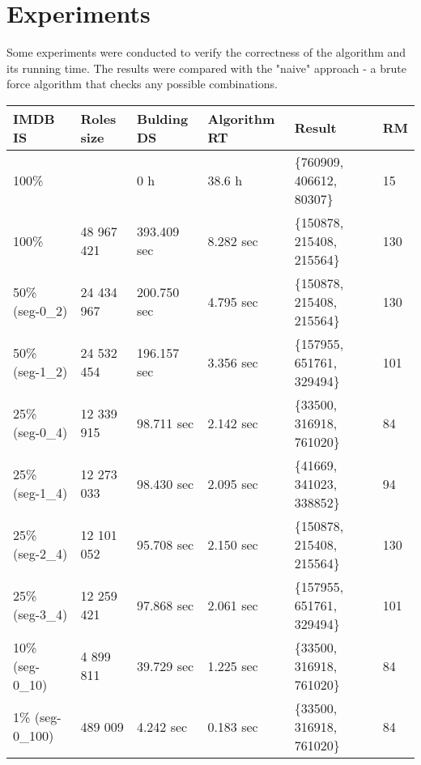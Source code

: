 \label{Experiments}
\section{Experiments}


Some experiments were conducted to verify the correctness of the algorithm and its running time. The results were compared with the "naive" approach - a brute force algorithm that checks any possible combinations. 

\begin{table}[h]
\begin{tabular}{|l|l|l|l|l|l|}
\hline
IMDB IS          & Roles size & Bulding DS  & Algorithm RT & Result                     & RM  \\ \hline
100\%            &            & 0 h         & 38.6 h       & \{760909, 406612, 80307\}  & 15  \\ \hline
100\%            & 48 967 421 & 393.409 sec & 8.282 sec    & \{150878, 215408, 215564\} & 130 \\ \hline
50\% (seg-0\_2)  & 24 434 967 & 200.750 sec & 4.795 sec    & \{150878, 215408, 215564\} & 130 \\ \hline
50\% (seg-1\_2)  & 24 532 454 & 196.157 sec & 3.356 sec    & \{157955, 651761, 329494\} & 101 \\ \hline
25\% (seg-0\_4)  & 12 339 915 & 98.711 sec  & 2.142 sec    & \{33500, 316918, 761020\}  & 84  \\ \hline
25\% (seg-1\_4)  & 12 273 033 & 98.430 sec  & 2.095 sec    & \{41669, 341023, 338852\}  & 94  \\ \hline
25\% (seg-2\_4)  & 12 101 052 & 95.708 sec  & 2.150 sec    & \{150878, 215408, 215564\} & 130 \\ \hline
25\% (seg-3\_4)  & 12 259 421 & 97.868 sec  & 2.061 sec    & \{157955, 651761, 329494\} & 101 \\ \hline
10\% (seg-0\_10) & 4 899 811  & 39.729 sec  & 1.225 sec    & \{33500, 316918, 761020\}  & 84  \\ \hline
1\% (seg-0\_100) & 489 009    & 4.242 sec   & 0.183 sec    & \{33500, 316918, 761020\}  & 84  \\ \hline
\end{tabular}
\end{table}